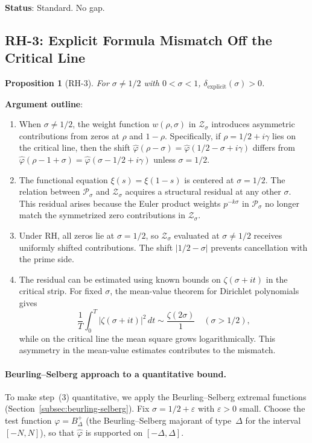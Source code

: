 \documentclass[11pt]{article}
\newtheorem{proposition}[theorem]{Proposition}
\theoremstyle{remark}
\begin{document}
\noindent\textbf{Status}: Standard.  No gap.

\subsection{RH-3: Explicit Formula Mismatch Off the Critical Line}
\label{subsec:RH3}

\begin{proposition}[RH-3]
For $\sigma\neq 1/2$ with $0<\sigma<1$, $\delta_{\mathrm{explicit}}(\sigma)>0$.
\end{proposition}

\noindent\textbf{Argument outline}:
\begin{enumerate}
  \item When $\sigma\neq 1/2$, the weight function $w(\rho,\sigma)$ in
    $\mathcal{Z}_\sigma$ introduces asymmetric contributions from zeros at
    $\rho$ and $1-\rho$.
    Specifically, if $\rho=1/2+i\gamma$ lies on the critical line, then
    the shift $\hat{\varphi}(\rho-\sigma)=\hat{\varphi}(1/2-\sigma+i\gamma)$
    differs from $\hat{\varphi}(\rho-1+\sigma)=\hat{\varphi}(\sigma-1/2+i\gamma)$
    unless $\sigma=1/2$.

  \item The functional equation $\xi(s)=\xi(1-s)$ is centered at $\sigma=1/2$.
    The relation between $\mathcal{P}_\sigma$ and $\mathcal{Z}_\sigma$ acquires
    a structural residual at any other $\sigma$.
    This residual arises because the Euler product weights $p^{-k\sigma}$ in
    $\mathcal{P}_\sigma$ no longer match the symmetrized zero contributions
    in $\mathcal{Z}_\sigma$.

  \item Under RH, all zeros lie at $\sigma=1/2$, so $\mathcal{Z}_\sigma$
    evaluated at $\sigma\neq 1/2$ receives uniformly shifted contributions.
    The shift $|1/2-\sigma|$ prevents cancellation with the prime side.

  \item The residual can be estimated using known bounds on $\zeta(\sigma+it)$ in the
    critical strip.
    For fixed $\sigma$, the mean-value theorem for Dirichlet polynomials gives
    \[
      \frac{1}{T}\int_0^T |\zeta(\sigma+it)|^2\,dt \sim \frac{\zeta(2\sigma)}{1}
      \quad(\sigma>1/2),
    \]
    while on the critical line the mean square grows logarithmically.
    This asymmetry in the mean-value estimates contributes to the mismatch.
\end{enumerate}

\paragraph{Beurling--Selberg approach to a quantitative bound.}
To make step~(3) quantitative, we apply the Beurling--Selberg extremal
functions (Section~\ref{subsec:beurling-selberg}).
Fix $\sigma=1/2+\varepsilon$ with $\varepsilon>0$ small.
Choose the test function $\varphi=B^+_\Delta$ (the Beurling--Selberg majorant
of type~$\Delta$ for the interval $[-N,N]$), so that $\hat{\varphi}$ is
supported on $[-\Delta,\Delta]$.
\end{document}

